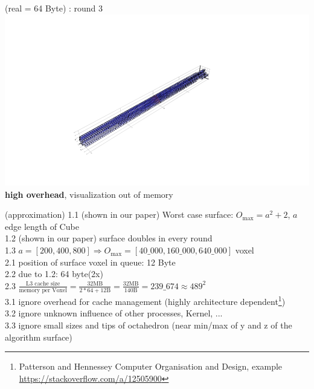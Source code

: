 \documentclass{beamer}
\begin{document}
\begin{frame}{\insertsubsection (real = 64 Byte) : round 3}
  \centering\includegraphics[trim=5cm 0.7cm 5cm 3cm, clip, width=1\linewidth]{algorithm_visualisation/srgcache64/srgcache_step2.png}\\
  \textbf{high overhead}, visualization out of memory\\
\end{frame}
\begin{frame}{\insertsubsection (approximation)}
  1.1 (shown in our paper) Worst case surface: $O_\text{max} = a^2+2$, $a$ edge length of Cube\\
  1.2 (shown in our paper) surface doubles in every round\\
  1.3 $a=[200,400,800] \Rightarrow O_\text{max} = [40\_000,160\_000,640\_000]$ voxel\\
  \vspace{0.3cm}
  2.1 position of surface voxel in queue: 12 Byte\\
  2.2 due to 1.2: 64 byte(2x)\\
  2.3 $\frac{\text{L3 cache size}}{\text{memory per Voxel}}=\frac{32\text{MB}}{2*64+12\text{B}} = \frac{32\text{MB}}{140\text{B}} = 239\_674 \approx 489^2$\\
  \vspace{0.3cm}
  3.1 ignore overhead for cache management (highly architecture dependent\footnote{Patterson and Hennessey Computer Organisation and Design, example \url{https://stackoverflow.com/a/12505900}})\\
  3.2 ignore unknown influence of other processes, Kernel, ...\\
  3.3 ignore small sizes and tips of octahedron (near min/max of y and z of the algorithm surface)
\end{frame}
\end{document}

